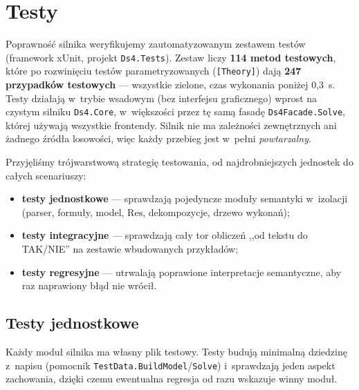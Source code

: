 \documentclass[11pt,a4paper]{article}
\newcommand{\Res}{\mathrm{Res}}
\begin{document}
\section{Testy}

Poprawność silnika weryfikujemy zautomatyzowanym zestawem testów (framework
xUnit, projekt \texttt{Ds4.Tests}). Zestaw liczy \textbf{114 metod testowych},
które po rozwinięciu testów parametryzowanych (\texttt{[Theory]}) dają
\textbf{247 przypadków testowych} --- wszystkie zielone, czas wykonania poniżej
0{,}3~s. Testy działają w~trybie wsadowym (bez interfejsu graficznego) wprost
na czystym silniku \texttt{Ds4.Core}, w~większości przez tę samą fasadę
\texttt{Ds4Facade.Solve}, której używają wszystkie frontendy. Silnik nie ma
zależności zewnętrznych ani żadnego źródła losowości, więc każdy przebieg jest
w~pełni \emph{powtarzalny}.

Przyjęliśmy trójwarstwową strategię testowania, od najdrobniejszych jednostek
do całych scenariuszy:

\begin{itemize}
  \item \textbf{testy jednostkowe} --- sprawdzają pojedyncze moduły semantyki
        w~izolacji (parser, formuły, model, $\Res$, dekompozycje, drzewo
        wykonań);
  \item \textbf{testy integracyjne} --- sprawdzają cały tor obliczeń
        ,,od tekstu do TAK/NIE'' na zestawie wbudowanych przykładów;
  \item \textbf{testy regresyjne} --- utrwalają poprawione interpretacje
        semantyczne, aby raz naprawiony błąd nie wrócił.
\end{itemize}

\subsection{Testy jednostkowe}

Każdy moduł silnika ma własny plik testowy. Testy budują minimalną dziedzinę
z~napisu (pomocnik \texttt{TestData.BuildModel}/\texttt{Solve}) i~sprawdzają
jeden aspekt zachowania, dzięki czemu ewentualna regresja od razu wskazuje
winny moduł.
\end{document}
